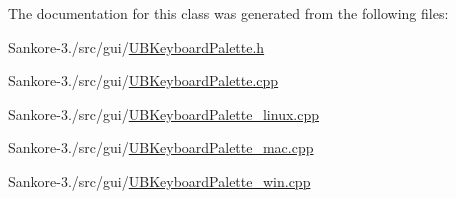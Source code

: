 The documentation for this class was generated from the following files\-:\begin{DoxyCompactItemize}
\item 
Sankore-\/3./src/gui/\hyperlink{_u_b_keyboard_palette_8h}{U\-B\-Keyboard\-Palette.\-h}\item 
Sankore-\/3./src/gui/\hyperlink{_u_b_keyboard_palette_8cpp}{U\-B\-Keyboard\-Palette.\-cpp}\item 
Sankore-\/3./src/gui/\hyperlink{_u_b_keyboard_palette__linux_8cpp}{U\-B\-Keyboard\-Palette\-\_\-linux.\-cpp}\item 
Sankore-\/3./src/gui/\hyperlink{_u_b_keyboard_palette__mac_8cpp}{U\-B\-Keyboard\-Palette\-\_\-mac.\-cpp}\item 
Sankore-\/3./src/gui/\hyperlink{_u_b_keyboard_palette__win_8cpp}{U\-B\-Keyboard\-Palette\-\_\-win.\-cpp}\end{DoxyCompactItemize}
